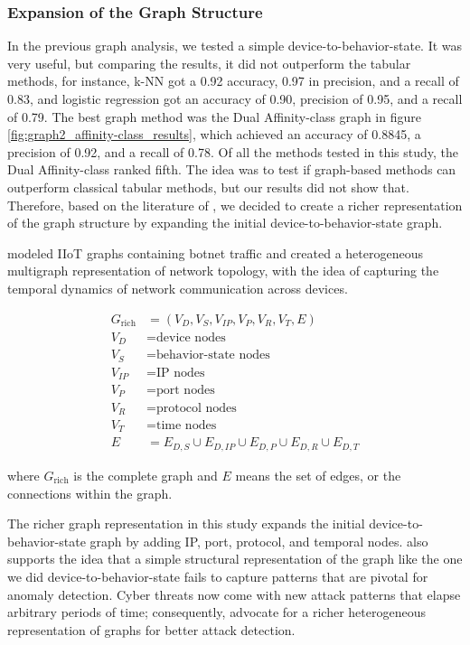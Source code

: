 \documentclass[final,5p,times,twocolumn]{elsarticle}
\begin{document}
\subsubsection{Expansion of the Graph Structure}
\label{Expansion of the Graph Structure}
{\color{red}In the previous graph analysis, we tested a simple device-to-behavior-state. It was very useful, but comparing the results, it did not outperform the tabular methods, for instance, k-NN got a 0.92 accuracy, 0.97 in precision, and a recall of 0.83, and logistic regression got an accuracy of 0.90, precision of 0.95, and a recall of 0.79. The best graph method was the Dual Affinity-class graph in figure \ref{fig:graph2_affinity-class_results}, which achieved an accuracy of 0.8845, a precision of 0.92, and a recall of 0.78. Of all the methods tested in this study, the Dual Affinity-class ranked fifth. The idea was to test if graph-based methods can outperform classical tabular methods, but our results did not show that. Therefore, based on the literature of \citep{altaf_gnn-based_2024}, we decided to create a richer representation of the graph structure by expanding the initial device-to-behavior-state graph.}

\citep{altaf_gnn-based_2024} modeled IIoT graphs containing botnet traffic and created a heterogeneous multigraph representation of network topology, with the idea of capturing the temporal dynamics of network communication across devices.

\[
\begin{aligned}
G_{\text{rich}} &= (V_D, V_S, V_{IP}, V_P, V_R, V_T, E) \\
V_D &= \text{device nodes} \\
V_S &= \text{behavior-state nodes} \\
V_{IP} &= \text{IP nodes} \\
V_P &= \text{port nodes} \\
V_R &= \text{protocol nodes} \\
V_T &= \text{time nodes} \\
E &= E_{D,S} \cup E_{D,IP} \cup E_{D,P} \cup E_{D,R} \cup E_{D,T}
\end{aligned}
\]

where \(G_{\text{rich}}\) is the complete graph and \(E\) means the set of edges, or the connections within the graph.

{\color{red}The richer graph representation in this study expands the initial device-to-behavior-state graph by adding IP, port, protocol, and temporal nodes. \citep{bilot2023graph} also supports the idea that a simple structural representation of the graph like the one we did device-to-behavior-state fails to capture patterns that are pivotal for anomaly detection.} Cyber threats now come with new attack patterns that elapse arbitrary periods of time; consequently, \citep{bilot2023graph} advocate for a richer heterogeneous representation of graphs for better attack detection.
\end{document}
